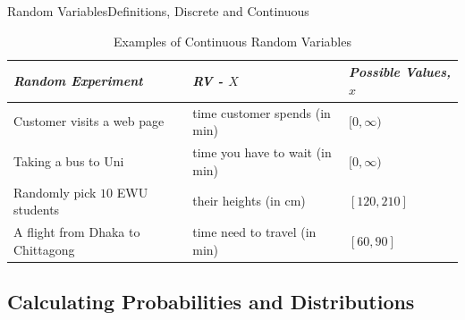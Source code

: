 \documentclass[8pt, usepdftitle=false]{beamer}
\begin{document}
\begin{frame}[allowframebreaks]{Random Variables}{Definitions, Discrete and Continuous}
\begin{itemize}
\small{
\raggedright
\begin{table}[H]
\begin{tabular}{l|l|l} 
\emph{Random Experiment} & \emph{RV - $X$} & \emph{Possible Values, $x$ } \\ \hline
Customer visits a web page & time customer spends (in min) & $[0, \infty)$ \\
Taking a bus to Uni & time you have to wait (in min) & $[0, \infty)$ \\
Randomly pick $10$ EWU students & their heights (in cm) & $[120, 210]$ \\
A flight from Dhaka to Chittagong & time need to travel (in min) & $[60, 90]$ \\

\end{tabular}
\caption{Examples of Continuous Random Variables}		
\end{table}
}


\end{itemize}
\end{frame}




\subsection{Calculating Probabilities and Distributions}
\frame{\subsectionpage}
\end{document}
